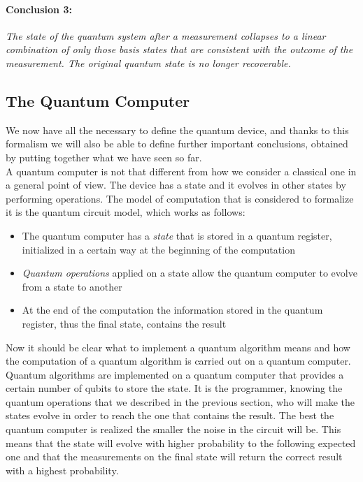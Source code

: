 \documentclass[english]{article}
\begin{document}
			\paragraph{Conclusion 3:} \emph{The state of the quantum system after a measurement collapses to a linear combination of only those basis states that are consistent with the outcome of the measurement. The original quantum state is no longer recoverable.}	
				
		\subsection{The Quantum Computer}
		\label{sec:quantumComputer}
			We now have all the necessary to define the quantum device, and thanks to this formalism we will also be able to define further important conclusions, obtained by putting together what we have seen so far. \\
			
			A quantum computer is not that different from how we consider a classical one in a general point of view. The device has a state and it evolves in other states by performing operations. The model of computation that is considered to formalize it is the quantum circuit model, which works as follows:
			
			\begin{itemize}
				\item The quantum computer has a \emph{state} that is stored in a quantum register, initialized in a certain way at the beginning of the computation
				
				\item \emph{Quantum operations} applied on a state allow the quantum computer to evolve from a state to another
				
				\item At the end of the computation the information stored in the quantum register, thus the final state, contains the result
			\end{itemize}
		
			Now it should be clear what to implement a quantum algorithm means and how the computation of a quantum algorithm is carried out on a quantum computer. Quantum algorithms are implemented on a quantum computer that provides a certain number of qubits to store the state. It is the programmer, knowing the quantum operations that we described in the previous section, who will make the states evolve in order to reach the one that contains the result. The best the quantum computer is realized the smaller the noise in the circuit will be. This means that the state will evolve with higher probability to the following expected one and that the measurements on the final state will return the correct result with a highest probability. \\
			
\end{document}

